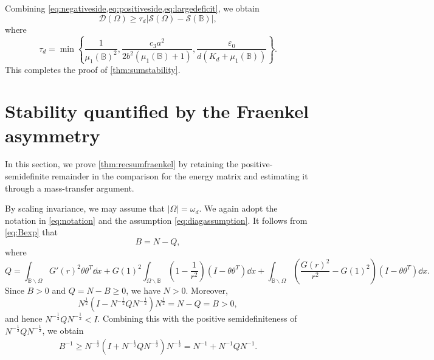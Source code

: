 \documentclass{amsart}
\numberwithin{equation}{section}
\theoremstyle{plain}
\theoremstyle{definition}
\theoremstyle{plain}
\theoremstyle{remark}
\numberwithin{figure}{section}
\newcommand{\B}{\mathbb{B}}
\newcommand{\D}{\mathcal{D}(\Omega)}
\newcommand{\s}{\mathcal{S}(\Omega)}
\begin{document}
Combining \cref{eq:negativeside,eq:positiveside,eq:largedeficit}, we obtain
\[
    \D\geq \tau_d |\s- \mathcal{S}(\B) |,
\]
where
\begin{equation}
    \label{eq:taud}
    \tau_d=\min\left\{\frac{1}{\mu_1(\B)^2}, \frac{c_3 a^2}{2b^2 (\mu_1(\B)+1)}, \frac{\varepsilon_0}{d(K_d+\mu_1(\B))}\right\}.
\end{equation}
This completes the proof of \cref{thm:sumstability}.




\section{Stability quantified by the Fraenkel asymmetry}

In this section, we prove \cref{thm:recsumfraenkel} by retaining the positive-semidefinite remainder in the comparison for the energy matrix and estimating it through a mass-transfer argument.

By scaling invariance, we may assume that $|\Omega|=\omega_d$. We again adopt the notation in \cref{eq:notation} and the assumption \cref{eq:diagassumption}. It follows from \cref{eq:Bexp} that
\[
    B=N-Q,
\]
where
\begin{equation}
    \label{eq:Q}
    Q = \int_{\B\backslash\Omega} G'(r)^2\theta\theta^T \dd x + G(1)^2\int_{\Omega\backslash \B} (1-\frac{1}{r^2})(I-\theta\theta^T) \dd x + \int_{\B\backslash\Omega} (\frac{G(r)^2}{r^2}-G(1)^2)(I-\theta\theta^T) \dd x.
\end{equation}
Since $B>0$ and $Q=N-B\geq 0$, we have $N>0$. Moreover,
\[
    N^{\frac{1}{2}} \left(I-N^{-\frac{1}{2}}QN^{-\frac{1}{2}}\right) N^{\frac{1}{2}}=N-Q=B>0,
\]
and hence $N^{-\frac{1}{2}}QN^{-\frac{1}{2}}<I$. Combining this with the positive semidefiniteness of $N^{-\frac{1}{2}}QN^{-\frac{1}{2}}$, we obtain
\begin{equation}
\label{eq:Binverselower}
\begin{aligned}
    B^{-1} %
      \geq N^{-\frac{1}{2}} \left(I+N^{-\frac{1}{2}}QN^{-\frac{1}{2}}\right) N^{-\frac{1}{2}}  = N^{-1}+N^{-1}QN^{-1}.
\end{aligned}
\end{equation}
\end{document}
